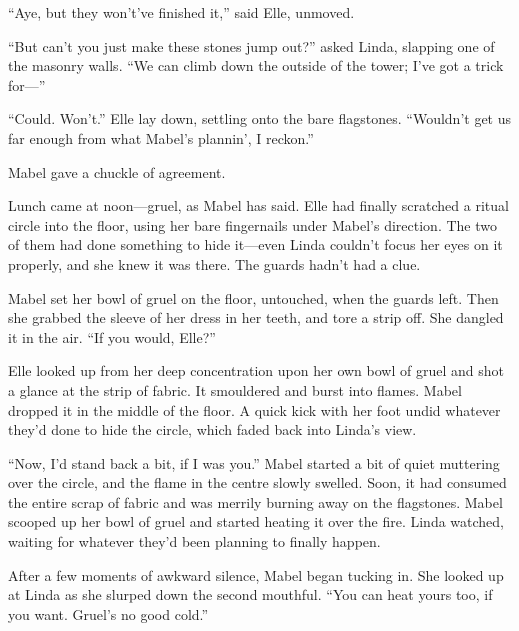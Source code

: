 ``Aye, but they won't've finished it,'' said Elle, unmoved.



``But can't you just make these stones jump out?'' asked Linda, slapping one of the masonry walls.
``We can climb down the outside of the tower; I've got a trick for---''

``Could.
Won't.''
Elle lay down, settling onto the bare flagstones.
``Wouldn't get us far enough from what Mabel's plannin', I reckon.''

Mabel gave a chuckle of agreement.

\storybreak

Lunch came at noon---gruel, as Mabel has said.
Elle had finally scratched a ritual circle into the floor, using her bare fingernails under Mabel's direction.
The two of them had done something to hide it---even Linda couldn't focus her eyes on it properly, and she knew it was there.
The guards hadn't had a clue.

Mabel set her bowl of gruel on the floor, untouched, when the guards left.
Then she grabbed the sleeve of her dress in her teeth, and tore a strip off.
She dangled it in the air.
``If you would, Elle?''

Elle looked up from her deep concentration upon her own bowl of gruel and shot a glance at the strip of fabric.
It smouldered and burst into flames.
Mabel dropped it in the middle of the floor.
A quick kick with her foot undid whatever they'd done to hide the circle, which faded back into Linda's view.

``Now, I'd stand back a bit, if I was you.''
Mabel started a bit of quiet muttering over the circle, and the flame in the centre slowly swelled.
Soon, it had consumed the entire scrap of fabric and was merrily burning away on the flagstones.
Mabel scooped up her bowl of gruel and started heating it over the fire.
Linda watched, waiting for whatever they'd been planning to finally happen.

After a few moments of awkward silence, Mabel began tucking in.
She looked up at Linda as she slurped down the second mouthful.
``You can heat yours too, if you want.
Gruel's no good cold.''

